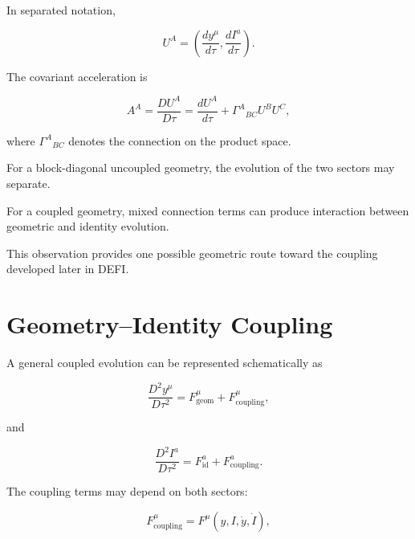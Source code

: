 \documentclass[12pt,oneside]{book}
\begin{document}
In separated notation,

\begin{equation}
    U^A
    =
    \left(
        \frac{dy^\mu}{d\tau},
        \frac{dI^a}{d\tau}
    \right).
    \label{eq:product-velocity-components}
\end{equation}

The covariant acceleration is

\begin{equation}
    A^A
    =
    \frac{D U^A}{D\tau}
    =
    \frac{dU^A}{d\tau}
    +
    \Gamma^A{}_{BC}
    U^B U^C,
    \label{eq:product-covariant-acceleration}
\end{equation}

where \(\Gamma^A{}_{BC}\) denotes the connection on the product
space.

For a block-diagonal uncoupled geometry, the evolution of the
two sectors may separate.

For a coupled geometry, mixed connection terms can produce
interaction between geometric and identity evolution.

This observation provides one possible geometric route toward
the coupling developed later in DEFI.


\section{Geometry--Identity Coupling}
\label{sec:geometry-identity-coupling}

A general coupled evolution can be represented schematically as

\begin{equation}
    \frac{D^2y^\mu}{D\tau^2}
    =
    F^\mu_{\mathrm{geom}}
    +
    F^\mu_{\mathrm{coupling}},
    \label{eq:geometry-sector-coupling}
\end{equation}

and

\begin{equation}
    \frac{D^2I^a}{D\tau^2}
    =
    F^a_{\mathrm{id}}
    +
    F^a_{\mathrm{coupling}}.
    \label{eq:identity-sector-coupling}
\end{equation}

The coupling terms may depend on both sectors:

\begin{equation}
    F^\mu_{\mathrm{coupling}}
    =
    F^\mu
    \left(
        y,
        I,
        \dot{y},
        \dot{I}
    \right),
\end{equation}
\end{document}

